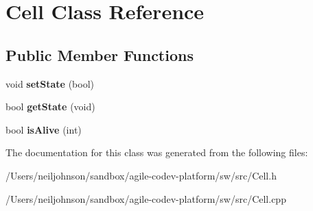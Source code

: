 \hypertarget{class_cell}{\section{Cell Class Reference}
\label{class_cell}
}
\subsection*{Public Member Functions}
\begin{DoxyCompactItemize}
\item 
\hypertarget{class_cell_adc17181480ee0eece1b6e5e34d207dc7}{void {\bfseries set\+State} (bool)}\label{class_cell_adc17181480ee0eece1b6e5e34d207dc7}

\item 
\hypertarget{class_cell_ace7a562feab40550e990e8e637e3549d}{bool {\bfseries get\+State} (void)}\label{class_cell_ace7a562feab40550e990e8e637e3549d}

\item 
\hypertarget{class_cell_a40bf50831d93e983029a4a16261461a7}{bool {\bfseries is\+Alive} (int)}\label{class_cell_a40bf50831d93e983029a4a16261461a7}

\end{DoxyCompactItemize}


The documentation for this class was generated from the following files\+:\begin{DoxyCompactItemize}
\item 
/\+Users/neiljohnson/sandbox/agile-\/codev-\/platform/sw/src/Cell.\+h\item 
/\+Users/neiljohnson/sandbox/agile-\/codev-\/platform/sw/src/Cell.\+cpp\end{DoxyCompactItemize}
